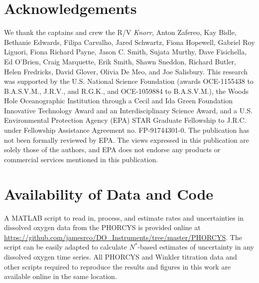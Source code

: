 \section{Acknowledgements}
We thank the captains and crew the R/V \emph{Knorr}, Anton Zafereo, Kay Bidle, Bethanie Edwards, Filipa Carvalho, Jared Schwartz, Fiona Hopewell, Gabriel Roy Liguori, Fiona Richard Payne, Jason C. Smith, Sujata Murthy, Dave Fisichella, Ed O'Brien, Craig Marquette, Erik Smith, Shawn Sneddon, Richard Butler, Helen Fredricks, David Glover, Olivia De Meo, and Joe Salisbury. This research was supported by the U.S. National Science Foundation (awards OCE-1155438 to B.A.S.V.M., J.R.V., and R.G.K., and OCE-1059884 to B.A.S.V.M.), the Woods Hole Oceanographic Institution through a Cecil and Ida Green Foundation Innovative Technology Award and an Interdisciplinary Science Award, and a U.S. Environmental Protection Agency (EPA) STAR Graduate Fellowship to J.R.C. under Fellowship Assistance Agreement no. FP-91744301-0. The publication has not been formally reviewed by EPA. The views expressed in this publication are solely those of the authors, and EPA does not endorse any products or commercial services mentioned in this publication.
\section{Availability of Data and Code}
\label{sec:Availability of Data and Code}
A MATLAB script to read in, process, and estimate rates and uncertainties in dissolved oxygen data from the PHORCYS is provided online at \url{https://github.com/jamesrco/DO_Instruments/tree/master/PHORCYS}. The script can be easily adapted to calculate $N^*$-based estimates of uncertainty in any dissolved oxygen time series. All PHORCYS and Winkler titration data and other scripts required to reproduce the results and figures in this work are available online in the same location.

\clearpage

